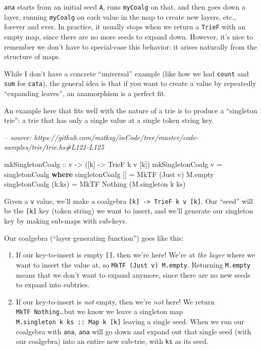 \documentclass[]{article}
\newenvironment{Shaded}{}{}
\newcommand{\CommentTok}[1]{\textcolor[rgb]{0.38,0.63,0.69}{\textit{#1}}}
\newcommand{\DataTypeTok}[1]{\textcolor[rgb]{0.56,0.13,0.00}{#1}}
\newcommand{\FunctionTok}[1]{\textcolor[rgb]{0.02,0.16,0.49}{#1}}
\newcommand{\KeywordTok}[1]{\textcolor[rgb]{0.00,0.44,0.13}{\textbf{#1}}}
\newcommand{\NormalTok}[1]{#1}
\newcommand{\OtherTok}[1]{\textcolor[rgb]{0.00,0.44,0.13}{#1}}
\begin{document}
\texttt{ana} starts from an initial seed \texttt{A}, runs \texttt{myCoalg} on
that, and then goes down a layer, running \texttt{myCoalg} on each value in the
map to create new layers, etc., forever and ever. In practice, it usually stops
when we return a \texttt{TrieF} with an empty map, since there are no more seeds
to expand down. However, it's nice to remember we don't have to special-case
this behavior: it arises naturally from the structure of maps.

While I don't have a concrete ``universal'' example (like how we had
\texttt{count} and \texttt{sum} for \texttt{cata}), the general idea is that if
you want to create a value by repeatedly ``expanding leaves'', an anamorphism is
a perfect fit.

An example here that fits well with the nature of a trie is to produce a
``singleton trie'': a trie that has only a single value at a single token string
key.

\begin{Shaded}
\begin{Highlighting}[]
\CommentTok{-- source: https://github.com/mstksg/inCode/tree/master/code-samples/trie/trie.hs#L121-L125}

\OtherTok{mkSingletonCoalg ::}\NormalTok{ v }\OtherTok{->}\NormalTok{ ([k] }\OtherTok{->} \DataTypeTok{TrieF}\NormalTok{ k v [k])}
\NormalTok{mkSingletonCoalg v }\FunctionTok{=}\NormalTok{ singletonCoalg}
  \KeywordTok{where}
\NormalTok{    singletonCoalg []     }\FunctionTok{=} \DataTypeTok{MkTF}\NormalTok{ (}\DataTypeTok{Just}\NormalTok{ v) M.empty}
\NormalTok{    singletonCoalg (k}\FunctionTok{:}\NormalTok{ks) }\FunctionTok{=} \DataTypeTok{MkTF} \DataTypeTok{Nothing}\NormalTok{  (M.singleton k ks)}
\end{Highlighting}
\end{Shaded}

Given a \texttt{v} value, we'll make a coalgebra
\texttt{{[}k{]}\ -\textgreater{}\ TrieF\ k\ v\ {[}k{]}}. Our ``seed'' will be
the \texttt{{[}k{]}} key (token string) we want to insert, and we'll generate
our singleton key by making sub-maps with sub-keys.

Our coalgebra (``layer generating function'') goes like this:

\begin{enumerate}
\def\labelenumi{\arabic{enumi}.}
\item
  If our key-to-insert is empty \texttt{{[}{]}}, then we're here! We're at
  \emph{the layer} where we want to insert the value at, so
  \texttt{MkTF\ (Just\ v)\ M.empty}. Returning \texttt{M.empty} means that we
  don't want to expand anymore, since there are no new seeds to expand into
  subtries.
\item
  If our key-to-insert is \emph{not} empty, then we're \emph{not} here! We
  return \texttt{MkTF\ Nothing}\ldots{}but we know we leave a singleton map
  \texttt{M.singleton\ k\ ks\ ::\ Map\ k\ {[}k{]}} leaving a single seed. When
  we run our coalgebra with \texttt{ana}, \texttt{ana} will go down and expand
  out that single seed (with our coalgebra) into an entire new sub-trie, with
  \texttt{ks} as its seed.
\end{enumerate}
\end{document}

